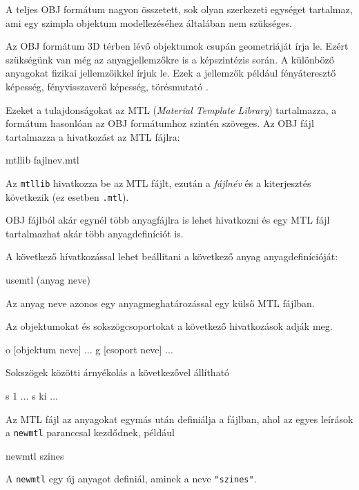 A teljes OBJ formátum nagyon összetett, sok olyan szerkezeti egységet tartalmaz, ami egy szimpla objektum modellezéséhez általában nem szükséges.


Az OBJ formátum 3D térben lévő objektumok csupán geometriáját írja le. Ezért szükségünk van még az anyagjellemzőkre is a képszintézis során. A különböző anyagokat fizikai jellemzőikkel írjuk le. Ezek a jellemzők például fényáteresztő képesség, fényvisszaverő képesség, törésmutató \cite{diane1995mtl}.


Ezeket a tulajdonságokat az MTL (\textit{Material Template Library}) tartalmazza, a formátum hasonlóan az OBJ formátumhoz szintén szöveges. Az OBJ fájl tartalmazza a hivatkozást az {MTL} fájlra:
\begin{python}
mtllib fajlnev.mtl
\end{python}
Az \texttt{mtllib} hivatkozza be az MTL fájlt, ezután a \textsl{fájlnév} és a kiterjesztés következik (ez esetben \texttt{.mtl}).

OBJ fájlból akár egynél több anyagfájlra is lehet hivatkozni és egy MTL fájl tartalmazhat akár több anyagdefiníciót is.

A következő hívatkozással lehet beállítani a következő anyag anyagdefinícióját:
\begin{python}
usemtl (anyag neve)
\end{python}
Az anyag neve azonos egy anyagmeghatározással egy külső MTL fájlban.

Az objektumokat és sokszögcsoportokat a következő hivatkozások adják meg.
\begin{python}
o [objektum neve]
  ...
  g [csoport neve]
  ...
\end{python}

Sokszögek közötti árnyékolás a következővel állítható
\begin{python}
s 1
  ...
  s ki
  ...
\end{python}


Az MTL fájl az anyagokat egymás után definiálja a fájlban, ahol az egyes leírások a \texttt{newmtl} paranccsal kezdődnek, például
\begin{python}
newmtl szines
\end{python}
A \texttt{newmtl} egy új anyagot definiál, aminek a neve \texttt{"szines"}.

